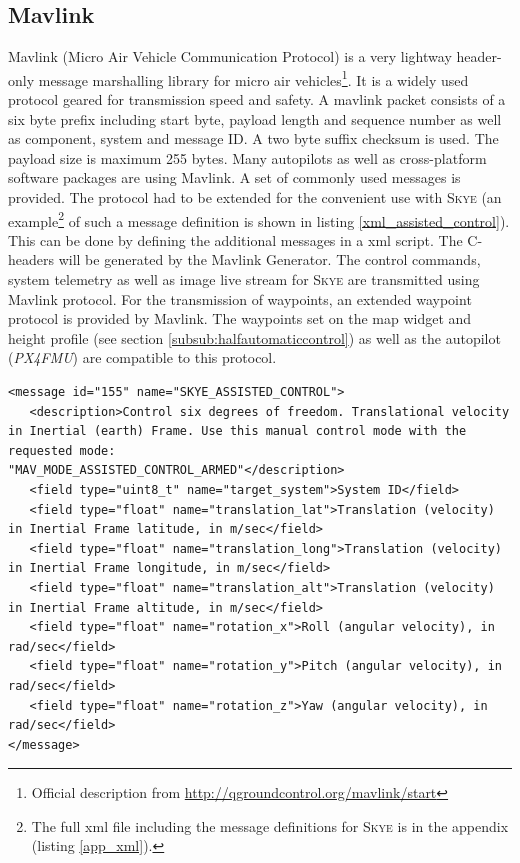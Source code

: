 \subsection{Mavlink}
\label{subsec:mavlink}
Mavlink (Micro Air Vehicle Communication Protocol) is a very lightway header-only message marshalling library for micro air vehicles\footnote{Official description from \url{http://qgroundcontrol.org/mavlink/start}}. It is a widely used protocol geared for transmission speed and safety. A mavlink packet consists of a six byte prefix including start byte, payload length and sequence number as well as component, system and message ID. A two byte suffix checksum is used. The payload size is maximum 255 bytes. Many autopilots as well as cross-platform software packages are using Mavlink.
A set of commonly used messages is provided. The protocol had to be extended for the convenient use with \textsc{Skye} (an example\footnote{The full xml file including the message definitions for \textsc{Skye} is in the appendix (listing \ref{app_xml}).} of such a message definition is shown in listing \ref{xml_assisted_control}). This can be done by defining the additional messages in a xml script. The C-headers will be generated by the Mavlink Generator. The control commands, system telemetry as well as image live stream for \textsc{Skye} are transmitted using Mavlink protocol. For the transmission of waypoints, an extended waypoint protocol is provided by Mavlink. The waypoints set on the map widget and height profile (see section \ref{subsub:halfautomaticcontrol}) as well as the autopilot (\textit{PX4FMU}) are compatible to this protocol.

\begin{lstlisting}[captionpos=b, caption=Sequence of skye.xml: Definition of the Assisted Control command Mavlink message. It consists of six 32 bit floating numbers for the input values and a 8 bit integer to indicate the target system's ID (the GUI could actually be connected to more than one UAV at the same time)., label=xml_assisted_control]
<message id="155" name="SKYE_ASSISTED_CONTROL">
   <description>Control six degrees of freedom. Translational velocity in Inertial (earth) Frame. Use this manual control mode with the requested mode: 
"MAV_MODE_ASSISTED_CONTROL_ARMED"</description>
   <field type="uint8_t" name="target_system">System ID</field>
   <field type="float" name="translation_lat">Translation (velocity) in Inertial Frame latitude, in m/sec</field>
   <field type="float" name="translation_long">Translation (velocity) in Inertial Frame longitude, in m/sec</field>
   <field type="float" name="translation_alt">Translation (velocity) in Inertial Frame altitude, in m/sec</field>
   <field type="float" name="rotation_x">Roll (angular velocity), in rad/sec</field>
   <field type="float" name="rotation_y">Pitch (angular velocity), in rad/sec</field>
   <field type="float" name="rotation_z">Yaw (angular velocity), in rad/sec</field>
</message>
\end{lstlisting}
